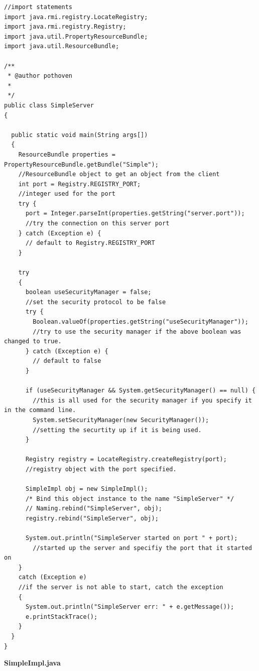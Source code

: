 \documentclass{article}
\begin{document}
\begin{lstlisting}
//import statements
import java.rmi.registry.LocateRegistry;
import java.rmi.registry.Registry;
import java.util.PropertyResourceBundle;
import java.util.ResourceBundle;

/**
 * @author pothoven
 *
 */
public class SimpleServer
{

  public static void main(String args[])
  {
    ResourceBundle properties = PropertyResourceBundle.getBundle("Simple");
    //ResourceBundle object to get an object from the client
    int port = Registry.REGISTRY_PORT;
    //integer used for the port
    try {
      port = Integer.parseInt(properties.getString("server.port"));
      //try the connection on this server port
    } catch (Exception e) {
      // default to Registry.REGISTRY_PORT
    }

    try
    {
      boolean useSecurityManager = false;
      //set the security protocol to be false
      try {
        Boolean.valueOf(properties.getString("useSecurityManager"));
        //try to use the security manager if the above boolean was changed to true.
      } catch (Exception e) {
        // default to false
      }

      if (useSecurityManager && System.getSecurityManager() == null) {
        //this is all used for the security manager if you specify it in the command line.
        System.setSecurityManager(new SecurityManager());
        //setting the securtity up if it is being used.
      }

      Registry registry = LocateRegistry.createRegistry(port);
      //registry object with the port specified.

      SimpleImpl obj = new SimpleImpl();
      /* Bind this object instance to the name "SimpleServer" */
      // Naming.rebind("SimpleServer", obj);
      registry.rebind("SimpleServer", obj);

      System.out.println("SimpleServer started on port " + port);
        //started up the server and specifiy the port that it started on
    }
    catch (Exception e)
    //if the server is not able to start, catch the exception
    {
      System.out.println("SimpleServer err: " + e.getMessage());
      e.printStackTrace();
    }
  }
}

\end{lstlisting}

\textbf{SimpleImpl.java}
\end{document}
